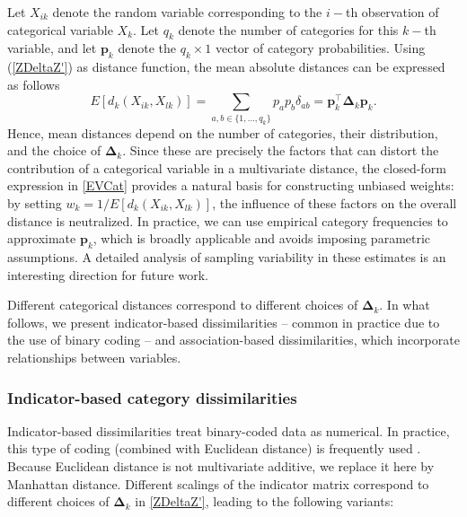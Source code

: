 \documentclass[12pt]{article}
\begin{document}
Let $X_{ik}$ denote the random variable corresponding to the $i-$th observation of categorical variable $X_{k}$. Let $q_k$ denote the number of categories for this $k-$th variable, and let $\bm{p}_k$ denote the $q_k \times 1$ vector of category probabilities. Using (\ref{ZDeltaZ'}) as distance function, the mean absolute distances can be expressed as follows
\begin{equation}\label{EVCat}
    E[d_k ({X}_{ik}, X_{lk})]= \sum_{a,b \in \{1, \dots,  q_k\}} {p_a p_b \delta_{ab}} = \bm{p}^{\top}_k\bm{\Delta}_k \bm{p}_k.
\end{equation}
Hence, mean distances depend on the number of categories, their distribution, and the choice of $\bm{\Delta}_k$. Since these are precisely the factors that can distort the contribution of a categorical variable in a multivariate distance, the closed-form expression in \eqref{EVCat} provides a natural basis for constructing unbiased weights: by setting $w_k = 1/E[d_k(X_{ik}, X_{lk})]$, the influence of these factors on the overall distance is neutralized. In practice, we can use empirical category frequencies to approximate $\bm{p}_k$, which is broadly applicable and avoids imposing parametric assumptions. A detailed analysis of sampling variability in these estimates is an interesting direction for future work.

Different categorical distances correspond to different choices of $\bm{\Delta}_k$.  In what follows, we present indicator-based dissimilarities -- common in practice due to the use of binary coding -- and association-based dissimilarities, which incorporate relationships between variables.

\subsubsection{Indicator-based category dissimilarities} \label{sect.independencategory}
Indicator-based dissimilarities treat binary-coded data as numerical. In practice, this type of coding (combined with Euclidean distance) is frequently used \parencite[e.g.,][]{BG:2020, HennigLiao2013}.  Because Euclidean distance is not multivariate additive, we replace it here by Manhattan distance. Different scalings of the indicator matrix correspond to different choices of $\bm{\Delta}_k$ in \eqref{ZDeltaZ'}, leading to the following variants:
\end{document}
